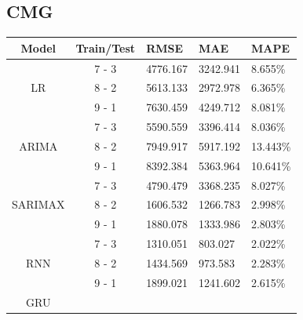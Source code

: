 \documentclass{ieeeojies}
\begin{document}
\subsection{CMG}
\begin{table}[H]
    \renewcommand{\arraystretch}{1.5}
    \centering
    \begin{tabular}{|c|c|p{1cm}|p{1cm}|p{1cm}|}
        \hline
        \textbf{Model} & \textbf{Train/Test} & \textbf{RMSE} & \textbf{MAE} & \textbf{MAPE} \\
        \hline
        \multirow{3}{*}{LR}
                       & 7 - 3               & 4776.167      & 3242.941     & 8.655\%       \\
        \cline{2-5}
                       & 8 - 2               & 5613.133      & 2972.978     & 6.365\%       \\
        \cline{2-5}
                       & 9 - 1               & 7630.459      & 4249.712     & 8.081\%       \\
        \hline
        \multirow{3}{*}{ARIMA}
                       & 7 - 3               & 5590.559      & 3396.414     & 8.036\%       \\
        \cline{2-5}
                       & 8 - 2               & 7949.917      & 5917.192     & 13.443\%      \\
        \cline{2-5}
                       & 9 - 1               & 8392.384      & 5363.964     & 10.641\%      \\
        \hline
        \multirow{3}{*}{SARIMAX}
                       & 7 - 3               & 4790.479      & 3368.235     & 8.027\%       \\
        \cline{2-5}
                       & 8 - 2               & 1606.532      & 1266.783     & 2.998\%       \\
        \cline{2-5}
                       & 9 - 1               & 1880.078      & 1333.986     & 2.803\%       \\
        \hline
        \multirow{3}{*}{RNN}
                       & 7 - 3               & 1310.051      & 803.027      & 2.022\%       \\
        \cline{2-5}
                       & 8 - 2               & 1434.569      & 973.583      & 2.283\%       \\
        \cline{2-5}
                       & 9 - 1               & 1899.021      & 1241.602     & 2.615\%       \\
        \hline
        \multirow{3}{*}{GRU}

\end{tabular}
\end{table}
\end{document}
